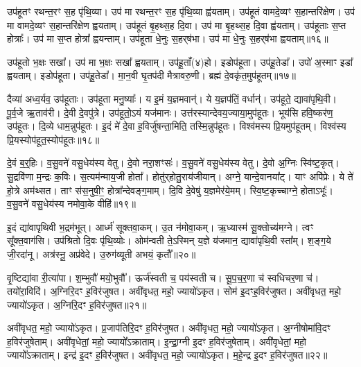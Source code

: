 उप॑हूतꣳ रथन्त॒रꣳ स॒ह पृ॑थि॒व्या।
उप॑ मा रथन्त॒रꣳ स॒ह पृ॑थि॒व्या ह्व॑यताम्।
उप॑हूतं वामदे॒व्यꣳ स॒हान्तरि॑क्षेण।
उप॑ मा वामदे॒व्यꣳ स॒हान्तरि॑क्षेण ह्वयताम्।
उप॑हूतं बृ॒हथ्स॒ह दि॒वा।
उप॑ मा बृ॒हथ्स॒ह दि॒वा ह्व॑यताम्।
उप॑हूताः स॒प्त होत्राः᳚।
उप॑ मा स॒प्त होत्रा᳚ ह्वयन्ताम्।
उप॑हूता धे॒नुः स॒हर्‌\mbox{}ष॑भा।
उप॑ मा धे॒नुः स॒हर्‌\mbox{}ष॑भा ह्वयताम्॥१६॥\ip

उप॑हूतो भ॒क्षः सखा᳚।
उप॑ मा भ॒क्षः सखा᳚ ह्वयताम्।
उप॑हू॒ताँ(४)हो।
इडोप॑हूता।
उप॑हू॒तेडा᳚।
उपो॑ अ॒स्माꣳ इडा᳚ ह्वयताम्।
इडोप॑हूता।
उप॑हू॒तेडा᳚।
मा॒न॒वी घृ॒तप॑दी मैत्रावरु॒णी।
ब्रह्म॑ दे॒वकृ॑त॒मुप॑हूतम्॥१७॥\ip

दैव्या॑ अध्व॒र्यव॒ उप॑हूताः।
उप॑हूता मनु॒ष्याः᳚।
य इ॒मं य॒ज्ञमवान्॑।
ये य॒ज्ञप॑तिं॒ वर्धान्॑।
उप॑हूते॒ द्यावा॑पृथि॒वी।
पू॒र्व॒जे ऋ॒ताव॑री।
दे॒वी दे॒वपु॑त्रे।
उप॑हूतो॒ऽयं यज॑मानः।
उत्त॑रस्यान्देवय॒ज्याया॒मुप॑हूतः।
भूय॑सि हवि॒ष्कर॑ण॒ उप॑हूतः।
दि॒व्ये धाम॒न्नुप॑हूतः।
इ॒दं मे॑ दे॒वा ह॒विर्जु॑षन्ता॒मिति॒ तस्मि॒न्नुप॑हूतः।
विश्व॑मस्य प्रि॒यमुप॑हूतम्।
विश्व॑स्य प्रि॒यस्योप॑हूत॒स्योप॑हूतः॥१८॥\ip{}

दे॒वं ब॒र्‌॒\mbox{}हिः।
व॒सु॒वने॑ वसु॒धेय॑स्य वेतु।
दे॒वो नरा॒शꣳसः॑।
व॒सु॒वने॑ वसु॒धेय॑स्य वेतु।
दे॒वो अ॒ग्निः स्वि॑ष्ट॒कृत्।
सु॒द्रवि॑णा म॒न्द्रः क॒विः।
स॒त्यम॑न्माय॒जी होता᳚।
होतु॑र्‌\mbox{}होतु॒राय॑जीयान्।
अग्ने॒ यान्दे॒वानया᳚ट्।
याꣳ अपि॑प्रेः।
ये ते॑ हो॒त्रे अम॑थ्सत।
ताꣳ स॑स॒नुषी॒ꣳ॒ होत्रा᳚न्देवङ्ग॒माम्।
दि॒वि दे॒वेषु॑ य॒ज्ञमेर॑ये॒मम्।
स्वि॒ष्ट॒कृच्चाग्ने॒ होता\-ऽभूः᳚।
व॒सु॒वने॑ वसु॒धेय॑स्य नमोवा॒के वीहि॑॥१९॥\ip\anuvakamend[अपि॑प्रेः॒ पञ्च॑ च]

इ॒दं द्या॑वापृथिवी भ॒द्रम॑भूत्।
आर्ध्म॑ सूक्तवा॒कम्।
उ॒त न॑मोवा॒कम्।
ऋ॒ध्यास्म॑ सू॒क्तोच्य॑मग्ने।
त्वꣳ सू᳚क्त॒वाग॑सि।
उप॑श्रितो दि॒वः पृ॑थि॒व्योः।
ओम॑न्वती ते॒\-ऽस्मिन् य॒ज्ञे य॑जमान॒ द्यावा॑पृथि॒वी स्ता᳚म्।
श॒ङ्ग॒ये जी॒रदा॑नू।
अत्र॑स्नू॒ अप्र॑वेदे।
उ॒रुग॑व्यूती अभयं॒ कृतौ᳚॥२०॥\ip

वृ॒ष्टिद्या॑वा री॒त्या॑पा।
श॒म्भुवौ॑ मयो॒भुवौ᳚।
ऊर्ज॑स्वती च॒ पय॑स्वती च।
सू॒प॒च॒र॒णा च॑ स्वधिचर॒णा च॑।
तयो॑रा॒विदि॑।
अ॒ग्निरि॒दꣳ ह॒विर॑जुषत।
अवी॑वृधत॒ महो॒ ज्यायो॑ऽकृत।
सोम॑ इ॒दꣳह॒विर॑जुषत।
अवी॑वृधत॒ महो॒ ज्यायो॑ऽकृत।
अ॒ग्निरि॒दꣳ ह॒विर॑जुषत॥२१॥\ip

अवी॑वृधत॒ महो॒ ज्यायो॑ऽकृत।
प्र॒जा\-प॑तिरि॒दꣳ ह॒विर॑जुषत।
अवी॑वृधत॒ महो॒ ज्यायो॑ऽकृत।
अ॒ग्नीषोमा॑वि॒दꣳ ह॒विर॑जुषेताम्।
अवी॑वृधेतां॒ महो॒ ज्यायो᳚\-ऽक्राताम्।
इ॒न्द्रा॒ग्नी इ॒दꣳ ह॒विर॑जुषेताम्।
अवी॑वृधेतां॒ महो॒ ज्यायो᳚\-ऽक्राताम्।
इन्द्र॑ इ॒दꣳ ह॒विर॑जुषत।
अवी॑वृधत॒ महो॒ ज्यायो॑ऽकृत।
म॒हे॒न्द्र इ॒दꣳ ह॒विर॑जुषत॥२२॥\ip

